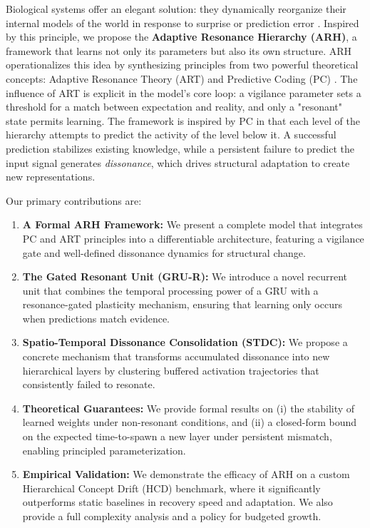 \documentclass{article}
\begin{document}
Biological systems offer an elegant solution: they dynamically reorganize their internal models of the world in response to surprise or prediction error \citep{Piaget1954}. Inspired by this principle, we propose the \textbf{Adaptive Resonance Hierarchy (ARH)}, a framework that learns not only its parameters but also its own structure. ARH operationalizes this idea by synthesizing principles from two powerful theoretical concepts: Adaptive Resonance Theory (ART) \citep{Grossberg1987} and Predictive Coding (PC) \citep{Rao1999}. The influence of ART is explicit in the model's core loop: a vigilance parameter sets a threshold for a match between expectation and reality, and only a "resonant" state permits learning. The framework is inspired by PC in that each level of the hierarchy attempts to predict the activity of the level below it. A successful prediction stabilizes existing knowledge, while a persistent failure to predict the input signal generates \emph{dissonance}, which drives structural adaptation to create new representations.

Our primary contributions are:
\begin{enumerate}
    \item \textbf{A Formal ARH Framework:} We present a complete model that integrates PC and ART principles into a differentiable architecture, featuring a vigilance gate and well-defined dissonance dynamics for structural change.
    \item \textbf{The Gated Resonant Unit (GRU-R):} We introduce a novel recurrent unit that combines the temporal processing power of a GRU with a resonance-gated plasticity mechanism, ensuring that learning only occurs when predictions match evidence.
    \item \textbf{Spatio-Temporal Dissonance Consolidation (STDC):} We propose a concrete mechanism that transforms accumulated dissonance into new hierarchical layers by clustering buffered activation trajectories that consistently failed to resonate.
    \item \textbf{Theoretical Guarantees:} We provide formal results on (i) the stability of learned weights under non-resonant conditions, and (ii) a closed-form bound on the expected time-to-spawn a new layer under persistent mismatch, enabling principled parameterization.
    \item \textbf{Empirical Validation:} We demonstrate the efficacy of ARH on a custom Hierarchical Concept Drift (HCD) benchmark, where it significantly outperforms static baselines in recovery speed and adaptation. We also provide a full complexity analysis and a policy for budgeted growth.
\end{enumerate}
\end{document}
